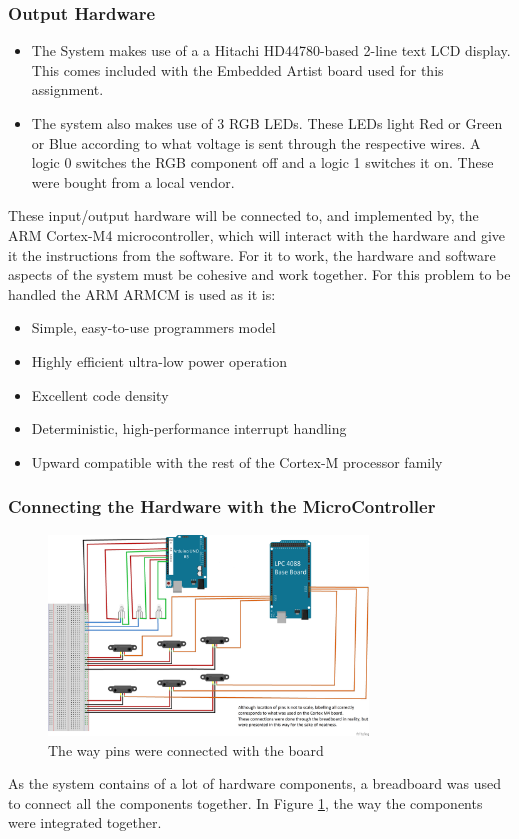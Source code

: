 \documentclass[11pt,a4paper,twocolumn]{article}
\begin{document}
\subsubsection{Output Hardware}

\begin{itemize}
 \item The System makes use of a a Hitachi HD44780-based 2-line text LCD display. This comes included with the Embedded Artist board used for this assignment.
 \item The system also makes use of 3  RGB LEDs. These LEDs light Red or Green or Blue according to what voltage is sent through the respective wires. A logic 0 switches the RGB component off and a logic 1 switches it on. These were bought from a local vendor. 
\end{itemize}


These input/output hardware will be connected to, and implemented by, the ARM Cortex-M4 microcontroller, which will interact with the hardware and give it the instructions from the software. For it to work, the hardware and software aspects of the system must be cohesive and work together. For this problem to be handled the ARM ARMCM is used as it is:
\begin{itemize}
	
	\item 	Simple, easy-to-use programmers model
	\item 	Highly efficient ultra-low power operation
	\item	Excellent code density
	\item 	Deterministic, high-performance interrupt handling
	\item	Upward compatible with the rest of the Cortex-M processor family
\end{itemize}

\subsubsection{Connecting the Hardware with the MicroController}

\begin{figure}
	\centering
	\includegraphics[width=85mm]{board}
	\caption{The way pins were connected with the board}
	\label{fig:Pins}
	\centering
\end{figure}
As the system contains of a lot of hardware components, a breadboard was used to connect all the components together. In Figure \ref{fig:Pins}, the way the components were integrated together. 
\end{document}
